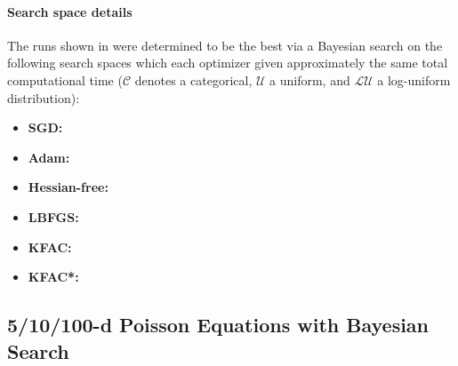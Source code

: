 \paragraph{Search space details} The runs shown in  were determined to be the best via a Bayesian search on the following search spaces which each optimizer given approximately the same total computational time ($\mathcal{C}$ denotes a categorical, $\mathcal{U}$ a uniform, and $\mathcal{LU}$ a log-uniform distribution):
\begin{itemize}
  \def\pathToRuns{kfac_pinns_exp/exp21_poisson_10d/tex/}
\item \textbf{SGD:} 
\item \textbf{Adam:} 
\item \textbf{Hessian-free:} 
\item \textbf{LBFGS:} 
\item \textbf{KFAC:} 
\item \textbf{KFAC*:} 
\end{itemize}

\subsection{5/10/100-d Poisson Equations with Bayesian Search}\label{sec:high-dimensional-poissons-app}

